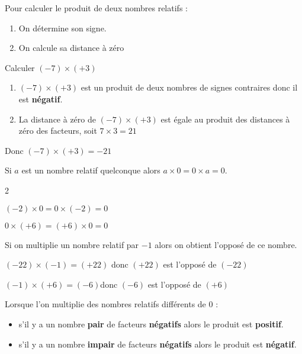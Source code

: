\begin{methode*1}
  Pour calculer le produit de deux nombres relatifs :
  \begin{enumerate}
    \item On détermine son signe.
    \item On calcule sa distance à zéro
  \end{enumerate}
  \exercice
  Calculer $(-7)\times (+3)$
  \correction
  \begin{enumerate}
    \item $(-7)\times (+3)$ est un produit de deux nombres de signes contraires donc il est \textbf{négatif}.
    \item La distance à zéro de $(-7)\times (+3)$ est égale au produit des distances à zéro des facteurs, soit $7\times 3 =21$
  \end{enumerate}
  Donc $(-7)\times (+3) = -21$
\end{methode*1}

\begin{propriete}
  Si $a$ est un nombre relatif quelconque alors $a\times0=0\times a=0$.
\end{propriete}

\begin{multicols}2
  \begin{exemple*1}
    $(-2)\times 0=0\times (-2)=0$
  \end{exemple*1}
  \begin{exemple*1}
    $0\times (+6)=(+6)\times 0=0$
  \end{exemple*1}
\end{multicols}

\begin{propriete}
  Si on multiplie un nombre relatif par $-1$ alors on obtient l'opposé de ce nombre.
\end{propriete}

\begin{exemple*1}
  $(-22)\times (-1)=(+22)$ donc $(+22)$ est l'opposé de $(-22)$
\end{exemple*1}

\begin{exemple*1}
  $(-1)\times(+6)=(-6)$donc  $(-6)$ est l'opposé de $(+6)$
\end{exemple*1}

\begin{propriete}
  Lorsque l'on multiplie des nombres relatifs différents de $0$ :
  \begin{itemize}
    \item s'il y a un nombre {\bf pair} de facteurs {\bf négatifs} alors le produit est {\bf positif}.
    \item s'il y a un nombre {\bf impair} de facteurs {\bf négatifs} alors le produit est {\bf n\'egatif}.
  \end{itemize}
\end{propriete}

